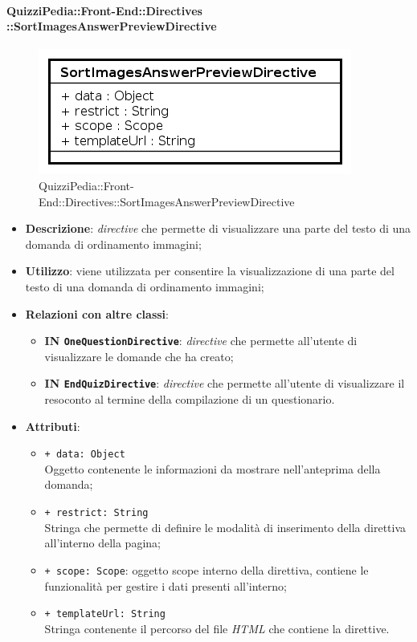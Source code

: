 	\paragraph{QuizziPedia::Front-End::Directives\\::SortImagesAnswerPreviewDirective}
		
		\label{QuizziPedia::Front-End::Directives::SortImagesAnswerPreviewDirective}
		
		\begin{figure}[ht]
			\centering
			\includegraphics[scale=0.80,keepaspectratio]{UML/Classi/Front-End/QuizziPedia_Front-end_Directives_SortImagesAnswerPreviewDirective.png}
			\caption{QuizziPedia::Front-End::Directives::SortImagesAnswerPreviewDirective}
		\end{figure} \FloatBarrier
		
		\begin{itemize}
			\item \textbf{Descrizione}: \textit{directive} che permette di visualizzare una parte del testo di una domanda di ordinamento immagini;
			\item \textbf{Utilizzo}: viene utilizzata per consentire la visualizzazione di una parte del testo di una domanda di ordinamento immagini;
			\item \textbf{Relazioni con altre classi}: 
			\begin{itemize}
				\item \textbf{IN \texttt{OneQuestionDirective}}: \textit{directive} che permette all'utente di visualizzare le domande che ha creato;
				\item \textbf{IN \texttt{EndQuizDirective}}: \textit{directive} che permette all'utente di visualizzare il resoconto al termine della compilazione di un questionario.
			\end{itemize}
			\item \textbf{Attributi}:
			\begin{itemize}
				\item \texttt{+ data: Object} \\ Oggetto contenente le informazioni da mostrare nell'anteprima della domanda;
		\item \texttt{+ restrict: String} \\ Stringa che permette di definire le modalità di inserimento della direttiva all'interno della pagina;
		\item \texttt{+ scope: Scope}: oggetto scope interno della direttiva, contiene le funzionalità per gestire i dati presenti all'interno;
		\item \texttt{+ templateUrl: String} \\ Stringa contenente il percorso del file \textit{HTML} che contiene la direttive.
			\end{itemize}
		\end{itemize}